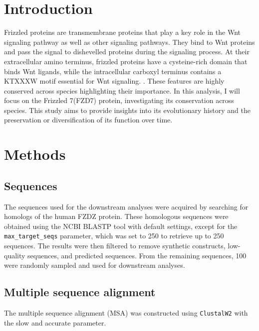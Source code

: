 \documentclass[11pt, a4paper]{article}
\begin{document}



\section{Introduction}
\label{intro}
Frizzled proteins are transmembrane proteins that play a key role in the Wnt signaling pathway as well as other signaling pathways. They bind to Wnt proteins and pass the signal to dishevelled proteins during the signaling process. At their extracellular amino terminus, frizzled proteins have a cysteine-rich domain that binds Wnt ligands, while the intracellular carboxyl terminus contains a KTXXXW motif essential for Wnt signaling. \cite{Huang2004-zi}. These features are highly conserved across species highlighting their importance. In this analysis, I will focus on the Frizzled 7(FZD7) protein, investigating its conservation across species. This  study aims to provide insights into its evolutionary history and the preservation or diversification of its function over time.
\section{Methods}
\label{BigMethods}
\subsection{Sequences}
\label{seq-meth}
The sequences used for the downstream analyses were acquired by searching for homologs of the human FZDZ protein. These homologous sequences were obtained using the NCBI BLASTP tool with default settings, except for the \texttt{max\_target\_seqs} parameter, which was set to 250 to retrieve up to 250 sequences. The results were then filtered to remove synthetic constructs, low-quality sequences, and predicted sequences. From the remaining sequences, 100 were randomly sampled and used for downstream analyses.
\subsection{Multiple sequence alignment}
\label{msa-meth}
The multiple sequence alignment (MSA) was constructed using \texttt{ClustalW2} with the slow and accurate parameter.
\end{document}
